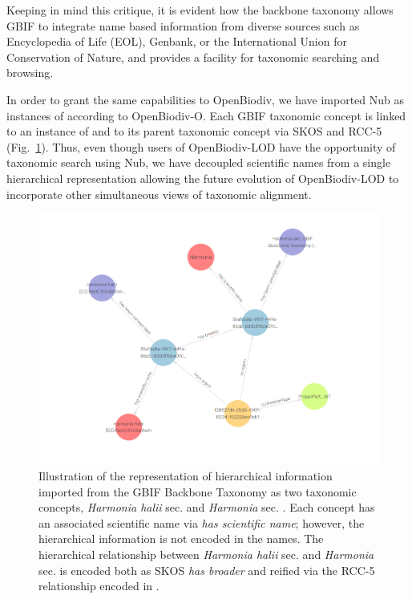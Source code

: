 Keeping in mind this critique, it is evident how the backbone taxonomy allows GBIF to integrate name based information from diverse sources such as Encyclopedia of Life (EOL), Genbank, or the International Union for Conservation of Nature, and provides a facility for taxonomic searching and browsing.

In order to grant the same capabilities to OpenBiodiv, we have imported Nub as instances of  according to OpenBiodiv-O. Each GBIF taxonomic concept is linked to an instance of  and to its parent taxonomic concept via SKOS and RCC-5 (Fig.~\ref{fig:harmonia-halii-visual}). Thus, even though users of OpenBiodiv-LOD have the opportunity of taxonomic search using Nub, we have decoupled scientific names from a single hierarchical representation allowing the future evolution of OpenBiodiv-LOD to incorporate other simultaneous views of taxonomic alignment.

\begin{figure}
\centering
\includegraphics[width=\textwidth]{Figures/harmonia-halii-visgraph}
\decoRule
\caption[Visual graph of \emph{Harmonia halii}]{Illustration of the representation of hierarchical information imported from the GBIF Backbone Taxonomy as two taxonomic concepts, \emph{Harmonia halii} sec. \cite{gbif_secretariat_gbif_2017} and \emph{Harmonia} sec. \cite{gbif_secretariat_gbif_2017}. Each concept has an associated scientific name via \emph{has scientific name}; however, the hierarchical information is not encoded in the names. The hierarchical relationship between \emph{Harmonia halii} sec. \cite{gbif_secretariat_gbif_2017} and \emph{Harmonia} sec. \cite{gbif_secretariat_gbif_2017} is encoded both as SKOS \emph{has broader} and reified via the RCC-5 relationship encoded in .}
\label{fig:harmonia-halii-visual}
\end{figure}

